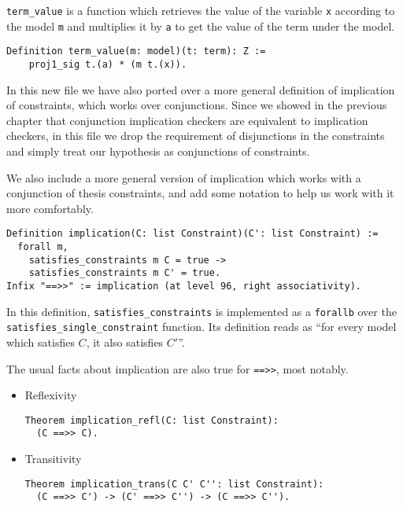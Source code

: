 \texttt{term_value} is a function which retrieves the value of the variable 
\texttt{x} according to the model \texttt{m} and multiplies it by 
\texttt{a} to get the value of the term under the model.

\begin{verbatim}
Definition term_value(m: model)(t: term): Z := 
    proj1_sig t.(a) * (m t.(x)).
\end{verbatim}



In this new file we have also ported over a more general definition of implication of
constraints, which works over conjunctions. Since we showed in the previous chapter
that conjunction implication checkers are equivalent to implication checkers, in this
file we drop the requirement of disjunctions in the constraints and simply treat our
hypothesis as conjunctions of constraints.

We also include a more general version of implication which works with a conjunction
of thesis constraints, and add some notation to help us work with it more comfortably.

\begin{verbatim}
Definition implication(C: list Constraint)(C': list Constraint) :=
  forall m, 
    satisfies_constraints m C = true ->
    satisfies_constraints m C' = true.
Infix "==>>" := implication (at level 96, right associativity).
\end{verbatim}

In this definition, \texttt{satisfies_constraints} is implemented as a 
\texttt{forallb} over the \texttt{satisfies_single_constraint} 
function. Its definition reads as ``for every model which satisfies $C$, it also
satisfies $C'$''.

The usual facts about implication are also true for \texttt{==>>}, most notably.

\begin{itemize}
    \item Reflexivity
\begin{verbatim}
Theorem implication_refl(C: list Constraint):
  (C ==>> C).
\end{verbatim}

    \item Transitivity
\begin{verbatim}
Theorem implication_trans(C C' C'': list Constraint):
  (C ==>> C') -> (C' ==>> C'') -> (C ==>> C'').
\end{verbatim}
  
\end{itemize}

